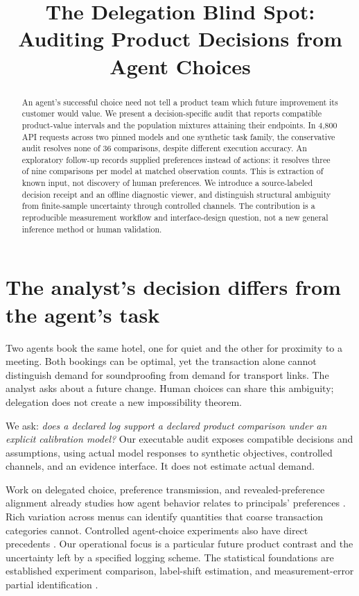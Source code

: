 \documentclass[manuscript,review,anonymous]{acmart}
\title{The Delegation Blind Spot: Auditing Product Decisions from Agent Choices}
\begin{document}
\begin{abstract}
An agent's successful choice need not tell a product team which future improvement its customer would value. We present a decision-specific audit that reports compatible product-value intervals and the population mixtures attaining their endpoints. In 4,800 API requests across two pinned models and one synthetic task family, the conservative audit resolves none of 36 comparisons, despite different execution accuracy. An exploratory follow-up records supplied preferences instead of actions: it resolves three of nine comparisons per model at matched observation counts. This is extraction of known input, not discovery of human preferences. We introduce a source-labeled decision receipt and an offline diagnostic viewer, and distinguish structural ambiguity from finite-sample uncertainty through controlled channels. The contribution is a reproducible measurement workflow and interface-design question, not a new general inference method or human validation.
\end{abstract}
\maketitle

\section{The analyst's decision differs from the agent's task}
Two agents book the same hotel, one for quiet and the other for proximity to a meeting. Both bookings can be optimal, yet the transaction alone cannot distinguish demand for soundproofing from demand for transport links. The analyst asks about a future change. Human choices can share this ambiguity; delegation does not create a new impossibility theorem.

We ask: \emph{does a declared log support a declared product comparison under an explicit calibration model?} Our executable audit exposes compatible decisions and assumptions, using actual model responses to synthetic objectives, controlled channels, and an evidence interface. It does not estimate actual demand.

Work on delegated choice, preference transmission, and revealed-preference alignment already studies how agent behavior relates to principals' preferences \cite{kops2026,kraft2026,suleymanov2026}. Rich variation across menus can identify quantities that coarse transaction categories cannot. Controlled agent-choice experiments also have direct precedents \cite{cherep2025}. Our operational focus is a particular future product contrast and the uncertainty left by a specified logging scheme. The statistical foundations are established experiment comparison, label-shift estimation, and measurement-error partial identification \cite{blackwell1953,lipton2018,finkelstein2021}.
\end{document}

